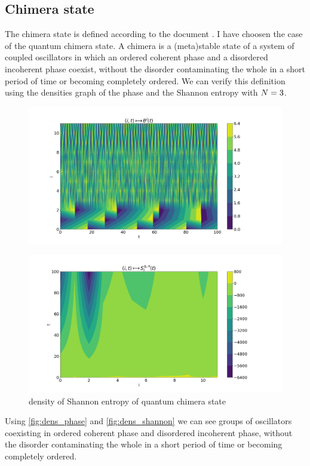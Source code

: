 \documentclass[1pt, a4paper]{article}
\begin{document}
\subsection{Chimera state}
\label{subs:chimera}
The chimera state is defined according to the document \cite{chimera}. I have choosen the case of the quantum chimera state. A chimera is a (meta)stable state of a system of coupled oscillators in which an ordered coherent phase and a disordered incoherent phase coexist, without the disorder contaminating the whole in a short period of time or becoming completely ordered. We can verify this definition using the densities graph of the phase and the Shannon entropy with $N=3\time4$.
\begin{figure}[htbp]
    \centering
    \includegraphics[width=.99\linewidth]{../outcomes/chimera_2D/dens_kuramoto.png}
    \caption{}
    \label{fig:dens_phase}
\end{figure}
\newpage
\begin{figure}[htbp]
    \centering
    \includegraphics[width=.99\linewidth]{../outcomes/chimera_2D/dens_shannon.png}
    \caption{density of Shannon entropy of quantum chimera state}
    \label{fig:dens_shannon}
\end{figure}
\noindent
Using \autoref{fig:dens_phase} and \autoref{fig:dens_shannon} we can see groups of oscillators coexisting in ordered coherent phase and disordered incoherent phase, without the disorder contaminating the whole in a short period of time or becoming completely ordered.
\end{document}

